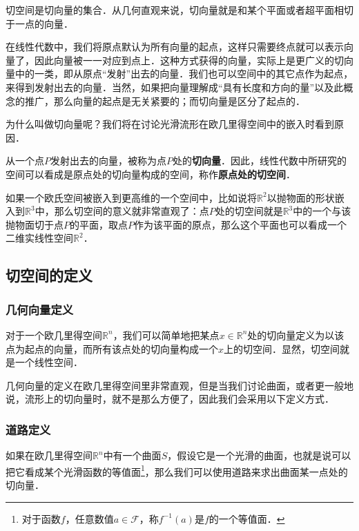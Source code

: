 

切空间是切向量的集合．从几何直观来说，切向量就是和某个平面或者超平面相切于一点的向量．

在线性代数中，我们将原点默认为所有向量的起点，这样只需要终点就可以表示向量了，因此向量被一一对应到点上．这种方式获得的向量，实际上是更广义的切向量中的一类，即从原点“发射”出去的向量．我们也可以空间中的其它点作为起点，来得到发射出去的向量．当然，如果把向量理解成“具有长度和方向的量”以及此概念的推广，那么向量的起点是无关紧要的；而切向量是区分了起点的．

为什么叫做切向量呢？我们将在讨论光滑流形在欧几里得空间中的嵌入时看到原因．%

从一个点$P$发射出去的向量，被称为点$P$处的\textbf{切向量}．因此，线性代数中所研究的空间可以看成是原点处的切向量构成的空间，称作\textbf{原点处的切空间}．

如果一个欧氏空间被嵌入到更高维的一个空间中，比如说将$\mathbb{R}^2$以抛物面的形状嵌入到$\mathbb{R}^3$中，那么切空间的意义就非常直观了：点$P$处的切空间就是$\mathbb{R}^3$中的一个与该抛物面切于点$P$的平面，取点$P$作为该平面的原点，那么这个平面也可以看成一个二维实线性空间$\mathbb{R}^2$．

\subsection{切空间的定义}

\subsubsection{几何向量定义}

对于一个欧几里得空间$\mathbb{R}^n$，我们可以简单地把某点$x\in\mathbb{R}^n$处的切向量定义为以该点为起点的向量，而所有该点处的切向量构成一个$x$上的切空间．显然，切空间就是一个线性空间．

几何向量的定义在欧几里得空间里非常直观，但是当我们讨论曲面，或者更一般地说，流形上的切向量时，就不是那么方便了，因此我们会采用以下定义方式．

\subsubsection{道路定义}

如果在欧几里得空间$\mathbb{R}^n$中有一个曲面$S$，假设它是一个光滑的曲面，也就是说可以把它看成某个光滑函数的等值面\footnote{对于函数$f$，任意数值$a\in\mathcal{F}$，称$f^{-1}(a)$是$f$的一个等值面．}，那么我们可以使用道路来求出曲面某一点处的切向量．

